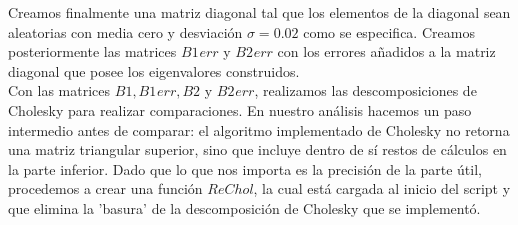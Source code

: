 \documentclass[letterpaper]{article}
\newcommand{\1}{\mathds{1}}
\theoremstyle{definition}
\theoremstyle{definition}
\theoremstyle{definition}
\theoremstyle{definition}
\theoremstyle{definition}
\begin{document}
\begin{enumerate}
\begin{enumerate}
        Creamos finalmente una matriz diagonal tal que los elementos de la diagonal sean aleatorias con media cero y desviación $\sigma=0.02$ como
        se especifica. Creamos posteriormente las matrices $B1_{}err$ y $B2_{}err$ con los errores añadidos a la matriz diagonal que posee los
        eigenvalores construidos.\\

        Con las matrices $B1,B1_{}err,B2$ y $B2_{}err$, realizamos las descomposiciones de Cholesky para realizar comparaciones. En nuestro análisis
        hacemos un paso intermedio antes de comparar: el algoritmo implementado de Cholesky no retorna una matriz triangular superior, sino que
        incluye dentro de sí restos de cálculos en la parte inferior. Dado que lo que nos importa es la precisión de la parte útil, procedemos
        a crear una función $ReChol$, la cual está cargada al inicio del script y que elimina la 'basura' de la descomposición de Cholesky que
        se implementó.\\


\end{enumerate}
\end{enumerate}
\end{document}
